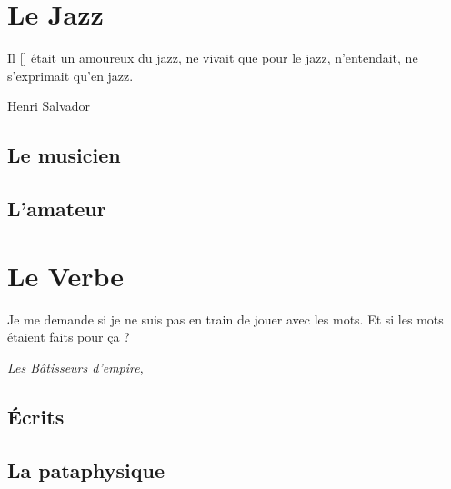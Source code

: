 \section{Le Jazz}
\epigraph{Il [\BV] était un amoureux du jazz, ne vivait que pour le jazz, n'entendait, ne s'exprimait qu'en jazz.}
{Henri Salvador}

\subsection{Le musicien}

\subsection{L'amateur}

\section{Le Verbe}
\epigraph{Je me demande si je ne suis pas en train de jouer avec les mots. Et si les mots étaient faits pour ça ?}
{\emph{Les Bâtisseurs d'empire}, \BV}

\subsection{Écrits}

\subsection{La pataphysique}
